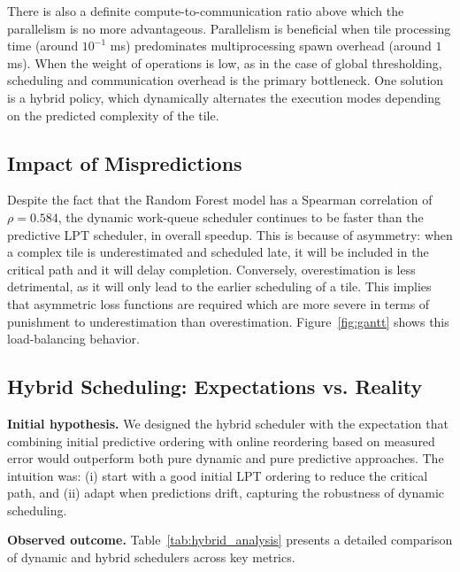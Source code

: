 \documentclass[acmsmall]{acmart}
\begin{document}
There is also a definite compute-to-communication ratio above which the parallelism is no more advantageous. 
Parallelism is beneficial when tile processing time (around $10^{-1}$ ms) predominates multiprocessing spawn overhead (around $1$ ms). 
When the weight of operations is low, as in the case of global thresholding, scheduling and communication overhead is the primary bottleneck. 
One solution is a hybrid policy, which dynamically alternates the execution modes depending on the predicted complexity of the tile.

\subsection{Impact of Mispredictions}

Despite the fact that the Random Forest model has a Spearman correlation of $\rho = 0.584$, 
the dynamic work-queue scheduler continues to be faster than the predictive LPT scheduler, in overall speedup. 
This is because of asymmetry: when a complex tile is underestimated and scheduled late, it will be included in the critical path and it will delay completion. 
Conversely, overestimation is less detrimental, as it will only lead to the earlier scheduling of a tile. 
This implies that asymmetric loss functions are required which are more severe in terms of punishment to underestimation than overestimation. 
Figure~\ref{fig:gantt} shows this load-balancing behavior.

\subsection{Hybrid Scheduling: Expectations vs. Reality}

\textbf{Initial hypothesis.} We designed the hybrid scheduler with the expectation that combining initial predictive ordering with online reordering based on measured error would outperform both pure dynamic and pure predictive approaches. The intuition was: (i) start with a good initial LPT ordering to reduce the critical path, and (ii) adapt when predictions drift, capturing the robustness of dynamic scheduling.

\textbf{Observed outcome.} Table~\ref{tab:hybrid_analysis} presents a detailed comparison of dynamic and hybrid schedulers across key metrics.
\end{document}
